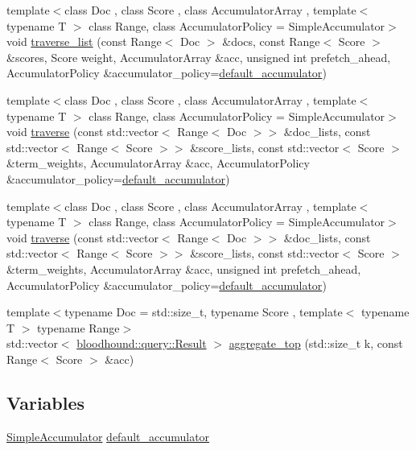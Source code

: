 \begin{DoxyCompactItemize}
\item 
{\footnotesize template$<$class Doc , class Score , class Accumulator\+Array , template$<$ typename T $>$ class Range, class Accumulator\+Policy  = Simple\+Accumulator$>$ }\\void \hyperlink{namespaceskit_aefabf6dd95494e20f6a58ad8b20e7bf9}{traverse\+\_\+list} (const Range$<$ Doc $>$ \&docs, const Range$<$ Score $>$ \&scores, Score weight, Accumulator\+Array \&acc, unsigned int prefetch\+\_\+ahead, Accumulator\+Policy \&accumulator\+\_\+policy=\hyperlink{namespaceskit_ae63f577a3ddf7bf051ff06113593330e}{default\+\_\+accumulator})
\item 
{\footnotesize template$<$class Doc , class Score , class Accumulator\+Array , template$<$ typename T $>$ class Range, class Accumulator\+Policy  = Simple\+Accumulator$>$ }\\void \hyperlink{namespaceskit_a974ce69b911c54f77fe9df504cd0990e}{traverse} (const std\+::vector$<$ Range$<$ Doc $>$$>$ \&doc\+\_\+lists, const std\+::vector$<$ Range$<$ Score $>$$>$ \&score\+\_\+lists, const std\+::vector$<$ Score $>$ \&term\+\_\+weights, Accumulator\+Array \&acc, Accumulator\+Policy \&accumulator\+\_\+policy=\hyperlink{namespaceskit_ae63f577a3ddf7bf051ff06113593330e}{default\+\_\+accumulator})
\item 
{\footnotesize template$<$class Doc , class Score , class Accumulator\+Array , template$<$ typename T $>$ class Range, class Accumulator\+Policy  = Simple\+Accumulator$>$ }\\void \hyperlink{namespaceskit_aa94138220b211447e88e37f43de5a313}{traverse} (const std\+::vector$<$ Range$<$ Doc $>$$>$ \&doc\+\_\+lists, const std\+::vector$<$ Range$<$ Score $>$$>$ \&score\+\_\+lists, const std\+::vector$<$ Score $>$ \&term\+\_\+weights, Accumulator\+Array \&acc, unsigned int prefetch\+\_\+ahead, Accumulator\+Policy \&accumulator\+\_\+policy=\hyperlink{namespaceskit_ae63f577a3ddf7bf051ff06113593330e}{default\+\_\+accumulator})
\item 
{\footnotesize template$<$typename Doc  = std\+::size\+\_\+t, typename Score , template$<$ typename T $>$ typename Range$>$ }\\std\+::vector$<$ \hyperlink{structbloodhound_1_1query_1_1Result}{bloodhound\+::query\+::\+Result} $>$ \hyperlink{namespaceskit_a5ef8c0239941e3274b7d2ca79bf0ac0d}{aggregate\+\_\+top} (std\+::size\+\_\+t k, const Range$<$ Score $>$ \&acc)
\end{DoxyCompactItemize}
\subsection*{Variables}
\begin{DoxyCompactItemize}
\item 
\hyperlink{classskit_1_1SimpleAccumulator}{Simple\+Accumulator} \hyperlink{namespaceskit_ae63f577a3ddf7bf051ff06113593330e}{default\+\_\+accumulator}
\end{DoxyCompactItemize}


